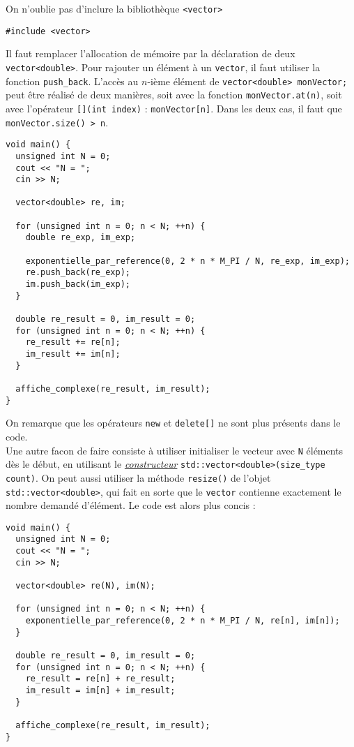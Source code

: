 \documentclass{book}
\newcommand{\inline}[1]{\texttt{#1}}
\begin{document}
\begin{correction}
On n'oublie pas d'inclure la bibliothèque \inline{<vector>}
\begin{verbatim}
#include <vector>
\end{verbatim}

Il faut remplacer l'allocation de mémoire par la déclaration de deux \inline{vector<double>}. Pour rajouter un élément à un \inline{vector}, il faut utiliser 
la fonction \inline{push_back}. L'accès au $n$-ième élément de \inline{vector<double> monVector;} peut être réalisé de deux manières, soit avec la fonction 
\inline{monVector.at(n)}, soit avec l'opérateur \inline{[](int index)} : \inline{monVector[n]}. Dans les deux cas, il faut que \inline{monVector.size() > n}.
\begin{verbatim}
void main() {
  unsigned int N = 0;
  cout << "N = ";
  cin >> N;

  vector<double> re, im;

  for (unsigned int n = 0; n < N; ++n) {
    double re_exp, im_exp;
    
    exponentielle_par_reference(0, 2 * n * M_PI / N, re_exp, im_exp);
    re.push_back(re_exp);
    im.push_back(im_exp);
  }

  double re_result = 0, im_result = 0;
  for (unsigned int n = 0; n < N; ++n) {
    re_result += re[n];
    im_result += im[n];
  }

  affiche_complexe(re_result, im_result);
}
\end{verbatim}
On remarque que les opérateurs \inline{new} et \inline{delete[]} ne sont plus présents dans le code.\\

Une autre facon de faire consiste à utiliser initialiser le vecteur avec \texttt{N} éléments dès le début, en utilisant le \href{https://en.cppreference.com/w/cpp/container/vector/vector}{\textit{constructeur}} \inline{std::vector<double>(size_type count)}. On peut aussi utiliser la méthode \inline{resize()} de l'objet \inline{std::vector<double>}, qui fait en sorte que le \inline{vector} contienne exactement le nombre demandé d'élément. Le code est alors plus concis :

\begin{verbatim}
void main() {
  unsigned int N = 0;
  cout << "N = ";
  cin >> N;

  vector<double> re(N), im(N);

  for (unsigned int n = 0; n < N; ++n) {
    exponentielle_par_reference(0, 2 * n * M_PI / N, re[n], im[n]);
  }

  double re_result = 0, im_result = 0;
  for (unsigned int n = 0; n < N; ++n) {
    re_result = re[n] + re_result;
    im_result = im[n] + im_result;
  }

  affiche_complexe(re_result, im_result);
}
\end{verbatim}
\end{correction}
\end{document}
